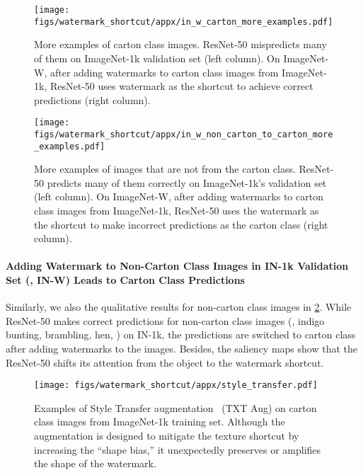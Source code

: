 \documentclass[10pt,twocolumn,letterpaper]{article}
\begin{document}
\begin{figure*}[h]
\centering
\begin{subfigure}{.475\textwidth}
  \centering
  \texttt{[image: figs/watermark\_shortcut/appx/in\_w\_carton\_more\_examples.pdf]}
  \caption{More examples of carton class images. ResNet-50 mispredicts many of them on ImageNet-1k validation set (left column). On ImageNet-W, after adding watermarks to carton class images from ImageNet-1k, ResNet-50 uses watermark as the shortcut to achieve correct predictions (right column).}
  \label{appx:fig:in_w_carton}
\end{subfigure}\hfill
\begin{subfigure}{.475\textwidth}
  \centering
  \texttt{[image: figs/watermark\_shortcut/appx/in\_w\_non\_carton\_to\_carton\_more\_examples.pdf]}
  \caption{More examples of images that are not from the carton class. ResNet-50 predicts many of them correctly on ImageNet-1k's validation set (left column). On ImageNet-W, after adding watermarks to carton class images from ImageNet-1k, ResNet-50 uses the watermark as the shortcut to make incorrect predictions as the carton class (right column).}
  \label{appx:fig:in_w_non_carton_to_carton}
\end{subfigure}
\caption{Adding watermarks alters the prediction and focused region of ResNet-50.}
\end{figure*}

\paragraph{Adding Watermark to Non-Carton Class Images in IN-1k Validation Set (\ie, IN-W) Leads to Carton Class Predictions} Similarly, we also the qualitative results for non-carton class images in \cref{appx:fig:in_w_non_carton_to_carton}. While ResNet-50 makes correct predictions for non-carton class images (\eg, indigo bunting, brambling, hen, \etc) on IN-1k, the predictions are switched to carton class after adding watermarks to the images. Besides, the saliency maps show that the ResNet-50 shifts its attention from the object to the watermark shortcut.

\begin{figure}[t]
    \centering
    \texttt{[image: figs/watermark\_shortcut/appx/style\_transfer.pdf]}
    \caption{Examples of Style Transfer augmentation~\cite{geirhos2019Int.Conf.Learn.Represent.ImageNettrained} (TXT Aug) on carton class images from ImageNet-1k training set. Although the augmentation is designed to mitigate the texture shortcut by increasing the ``shape bias,'' it unexpectedly preserves or amplifies the shape of the watermark.}
    \label{appx:fig:style_transfer_watermark}
\end{figure}
\end{document}
